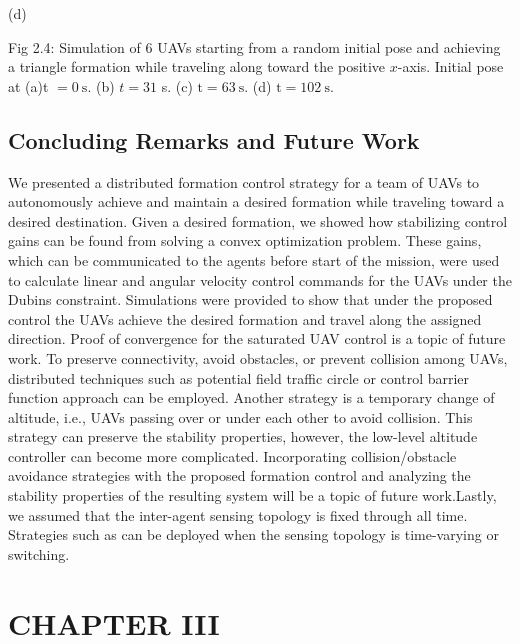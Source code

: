 \documentclass[10pt]{article}
\begin{document}
(d)

Fig 2.4: Simulation of 6 UAVs starting from a random initial pose and achieving a triangle formation while traveling along toward the positive $x$-axis. Initial pose at (a)t $=0 \mathrm{~s}$. (b) $t=31$ s. (c) $\mathrm{t}=63 \mathrm{~s}$. (d) $\mathrm{t}=102 \mathrm{~s}$.

\subsection{Concluding Remarks and Future Work}
We presented a distributed formation control strategy for a team of UAVs to autonomously achieve and maintain a desired formation while traveling toward a desired destination. Given a desired formation, we showed how stabilizing control gains can be found from solving a convex optimization problem. These gains, which can be communicated to the agents before start of the mission, were used to calculate linear and angular velocity control commands for the UAVs under the Dubins constraint. Simulations were provided to show that under the proposed control the UAVs achieve the desired formation and travel along the assigned direction. Proof of convergence for the saturated UAV control is a topic of future work. To preserve connectivity, avoid obstacles, or prevent collision among UAVs, distributed techniques such as potential field traffic circle or control barrier function approach can be employed. Another strategy is a temporary change of altitude, i.e., UAVs passing over or under each other to avoid collision. This strategy can preserve the stability properties, however, the low-level altitude controller can become more complicated. Incorporating collision/obstacle avoidance strategies with the proposed formation control and analyzing the stability properties of the resulting system will be a topic of future work.Lastly, we assumed that the inter-agent sensing topology is fixed through all time. Strategies such as can be deployed when the sensing topology is time-varying or switching.

\section{CHAPTER III}
\end{document}
